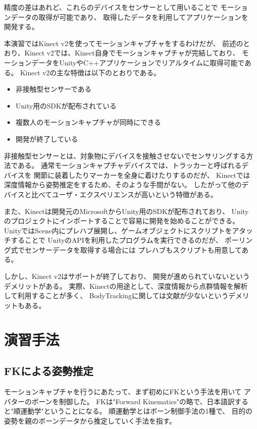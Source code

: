 \documentclass[a4j]{jsarticle}
\begin{document}
精度の差はあれど、これらのデバイスをセンサーとして用いることで
モーションデータの取得が可能であり、
取得したデータを利用してアプリケーションを開発する。

本演習ではKinect v2を使ってモーションキャプチャをするわけだが、
前述のとおり、Kinect v2では、Kinect自身でモーションキャプチャが完結しており、
モーションデータをUnityやC++アプリケーションでリアルタイムに取得可能である。
Kinect v2の主な特徴は以下のとおりである。

\begin{itemize}
  \item 非接触型センサーである
  \item Unity用のSDKが配布されている
  \item 複数人のモーションキャプチャが同時にできる
  \item 開発が終了している
\end{itemize}

非接触型センサーとは、対象物にデバイスを接触させないでセンサリングする方法である。
通常モーションキャプチャデバイスでは、トラッカーと呼ばれるデバイスを
関節に装着したりマーカーを全身に着けたりするのだが、
Kinectでは深度情報から姿勢推定をするため、そのような手間がない。
したがって他のデバイスと比べてユーザ・エクスペリエンスが高いという特徴がある。

また、Kinectは開発元のMicrosoftからUnity用のSDKが配布されており、
Unityのプロジェクトにインポートすることで容易に開発を始めることができる。
UnityではScene内にプレハブ展開し、ゲームオブジェクトにスクリプトをアタッチすることで
UnityのAPIを利用したプログラムを実行できるのだが、
ポーリング式でセンサーデータを取得する場合には
プレハブもスクリプトも用意してある。

しかし、Kinect v2はサポートが終了しており、
開発が進められていないというデメリットがある。
実際、Kinectの用途として、深度情報から点群情報を解析して利用することが多く、
BodyTrackingに関しては文献が少ないというデメリットもある。

\section{演習手法}

\subsection{FKによる姿勢推定}

モーションキャプチャを行うにあたって、まず初めにFKという手法を用いて
アバターのボーンを制御した。
FKは"Forward Kinematics"の略で、日本語訳すると"順運動学"ということになる。
順運動学とはボーン制御手法の1種で、
目的の姿勢を親のボーンデータから推定していく手法を指す。
\end{document}
